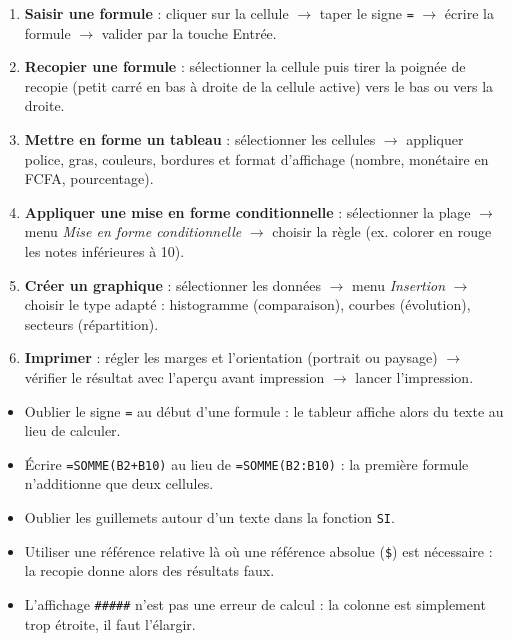 \documentclass[11pt]{article}
\newcommand{\cle}[1]{{\popxbold\color{popdark}#1}}
\begin{document}
\begin{methode}
\begin{enumerate}
  \item \textbf{Saisir une formule} : cliquer sur la cellule $\rightarrow$ taper le signe \texttt{=} $\rightarrow$ écrire la formule $\rightarrow$ valider par la touche Entrée.
  \item \textbf{Recopier une formule} : sélectionner la cellule puis tirer la \cle{poignée de recopie} (petit carré en bas à droite de la cellule active) vers le bas ou vers la droite.
  \item \textbf{Mettre en forme un tableau} : sélectionner les cellules $\rightarrow$ appliquer police, gras, couleurs, bordures et format d'affichage (nombre, monétaire en FCFA, pourcentage).
  \item \textbf{Appliquer une mise en forme conditionnelle} : sélectionner la plage $\rightarrow$ menu \emph{Mise en forme conditionnelle} $\rightarrow$ choisir la règle (ex. colorer en rouge les notes inférieures à 10).
  \item \textbf{Créer un graphique} : sélectionner les données $\rightarrow$ menu \emph{Insertion} $\rightarrow$ choisir le type adapté : histogramme (comparaison), courbes (évolution), secteurs (répartition).
  \item \textbf{Imprimer} : régler les marges et l'orientation (portrait ou paysage) $\rightarrow$ vérifier le résultat avec l'\cle{aperçu avant impression} $\rightarrow$ lancer l'impression.
\end{enumerate}
\end{methode}

\begin{attention}
\begin{itemize}
  \item Oublier le signe \texttt{=} au début d'une formule : le tableur affiche alors du texte au lieu de calculer.
  \item Écrire \texttt{=SOMME(B2+B10)} au lieu de \texttt{=SOMME(B2:B10)} : la première formule n'additionne que deux cellules.
  \item Oublier les guillemets autour d'un texte dans la fonction \texttt{SI}.
  \item Utiliser une référence relative là où une référence absolue (\texttt{\$}) est nécessaire : la recopie donne alors des résultats faux.
  \item L'affichage \texttt{\#\#\#\#\#} n'est pas une erreur de calcul : la colonne est simplement trop étroite, il faut l'élargir.
\end{itemize}
\end{attention}
\end{document}
